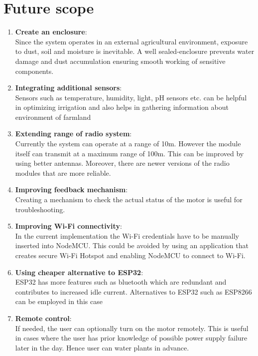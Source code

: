 \section{Future scope}
\begin{enumerate}
  \item \textbf{Create an enclosure}: \\
    Since the system operates in an external agricultural
    environment, exposure to    dust, soil and moisture is
    inevitable. A well sealed-enclosure prevents water damage and
    dust accumulation ensuring smooth working of sensitive components.
  \item \textbf{Integrating additional sensors}: \\
    Sensors such as temperature, humidity, light, pH sensors etc. can
    be helpful in optimizing irrigation and also helps in
    gathering information about environment of farmland
  \item \textbf{Extending range of radio system}: \\
    Currently the system can operate at a range of 10m. However the module itself can transmit at a maximum range of 100m. This can be improved by using better antennas. Moreover, there are newer versions of the radio modules that are more reliable.
  \item \textbf{Improving feedback mechanism}: \\
    Creating a mechanism to check the actual status of the motor is useful for troubleshooting.
  \item \textbf{Improving Wi-Fi connectivity}: \\
    In the current implementation the Wi-Fi credentials have to be manually inserted into NodeMCU. This could be avoided by using an application that creates secure Wi-Fi Hotspot and enabling NodeMCU to connect to Wi-Fi.	
  \item \textbf{Using cheaper alternative to ESP32}: \\
    ESP32 has more features such as bluetooth which are redundant and contributes to increased idle current. Alternatives to ESP32 such as ESP8266 can be employed in this case
  \item \textbf{Remote control}: \\
    If needed, the user can optionally turn on the motor remotely.
    This is useful in cases where the user has prior knowledge of
    possible power supply failure later in the day. Hence user can
    water plants in advance.
\end{enumerate}

